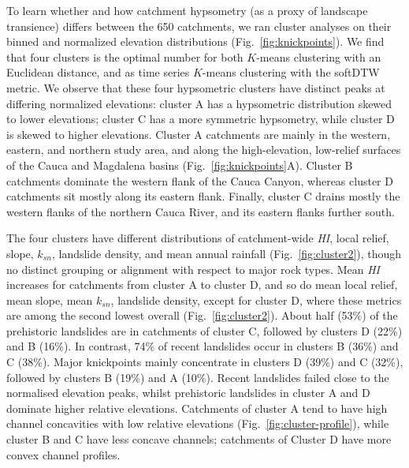\documentclass[draft]{agujournal2019}
\begin{document}
\par To learn whether and how catchment hypsometry (as a proxy of landscape transience) differs between the 650 catchments, we ran cluster analyses on their binned and normalized elevation distributions (Fig.~\ref{fig:knickpoints}). We find that four clusters is the optimal number for both $K$-means clustering with an Euclidean distance, and as time series $K$-means clustering with the softDTW metric. We observe that these four hypsometric clusters have distinct peaks at differing normalized elevations: cluster A has a hypsometric distribution skewed to lower elevations; cluster C has a more symmetric hypsometry, while cluster D is skewed to higher elevations. Cluster A catchments are mainly in the western, eastern, and northern study area, and along the high-elevation, low-relief surfaces of the Cauca and Magdalena basins (Fig.~\ref{fig:knickpoints}A). Cluster B catchments dominate the western flank of the Cauca Canyon, whereas cluster D catchments sit mostly along its eastern flank. Finally, cluster C drains mostly the western flanks of the northern Cauca River, and its eastern flanks further south. 

\par The four clusters have different distributions of catchment-wide \textit{HI}, local relief, slope, $k_{sn}$, landslide density, and mean annual rainfall (Fig.~\ref{fig:cluster2}), though no distinct grouping or alignment with respect to major rock types. Mean \textit{HI} increases for catchments from cluster A to cluster D, and so do mean local relief, mean slope, mean $k_{sn}$, landslide density, except for cluster D, where these metrics are among the second lowest overall (Fig.~\ref{fig:cluster2}). About half (53\%) of the prehistoric landslides are in catchments of cluster C, followed by clusters D (22\%) and B (16\%). In contrast, 74\% of recent landslides occur in clusters B (36\%) and C (38\%). Major knickpoints mainly concentrate in clusters D (39\%) and C (32\%), followed by clusters B (19\%) and A (10\%). Recent landslides failed close to the normalised elevation peaks, whilst prehistoric landslides in cluster A and D dominate higher relative elevations. Catchments of cluster A tend to have high channel concavities with low relative elevations (Fig.~\ref{fig:cluster-profile}), while cluster B and C have less concave channels; catchments of Cluster D have more convex channel profiles.



\end{document}
